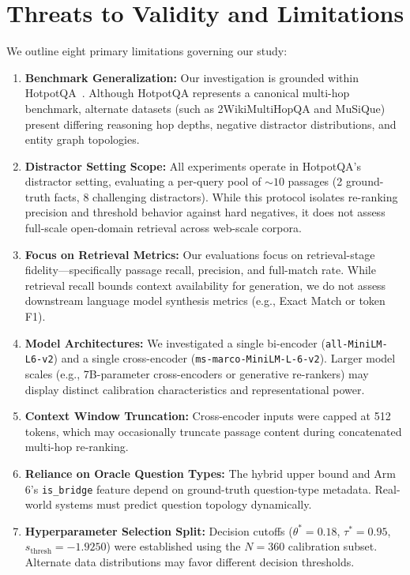 \documentclass{article}
\begin{document}
\section{Threats to Validity and Limitations}
\label{sec:threats}
We outline eight primary limitations governing our study:
\begin{enumerate}\setlength{\itemsep}{0pt}\setlength{\parsep}{0pt}\setlength{\parskip}{0pt}
    \item \textbf{Benchmark Generalization:} Our investigation is grounded within HotpotQA~\cite{yang2018hotpotqa}. Although HotpotQA represents a canonical multi-hop benchmark, alternate datasets (such as 2WikiMultiHopQA and MuSiQue) present differing reasoning hop depths, negative distractor distributions, and entity graph topologies.
    \item \textbf{Distractor Setting Scope:} All experiments operate in HotpotQA's distractor setting, evaluating a per-query pool of $\sim 10$ passages (2 ground-truth facts, 8 challenging distractors). While this protocol isolates re-ranking precision and threshold behavior against hard negatives, it does not assess full-scale open-domain retrieval across web-scale corpora.
    \item \textbf{Focus on Retrieval Metrics:} Our evaluations focus on retrieval-stage fidelity—specifically passage recall, precision, and full-match rate. While retrieval recall bounds context availability for generation, we do not assess downstream language model synthesis metrics (e.g., Exact Match or token F1).
    \item \textbf{Model Architectures:} We investigated a single bi-encoder (\texttt{all-MiniLM-L6-v2}) and a single cross-encoder (\texttt{ms-marco-MiniLM-L-6-v2}). Larger model scales (e.g., 7B-parameter cross-encoders or generative re-rankers) may display distinct calibration characteristics and representational power.
    \item \textbf{Context Window Truncation:} Cross-encoder inputs were capped at 512 tokens, which may occasionally truncate passage content during concatenated multi-hop re-ranking.
    \item \textbf{Reliance on Oracle Question Types:} The hybrid upper bound and Arm 6's \texttt{is\_bridge} feature depend on ground-truth question-type metadata. Real-world systems must predict question topology dynamically.
    \item \textbf{Hyperparameter Selection Split:} Decision cutoffs ($\theta^*=0.18$, $\tau^*=0.95$, $s_{\text{thresh}}=-1.9250$) were established using the $N=360$ calibration subset. Alternate data distributions may favor different decision thresholds.

\end{enumerate}
\end{document}
